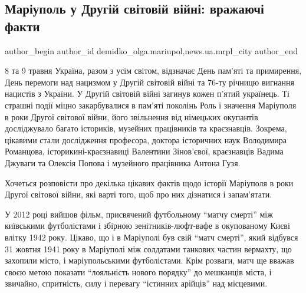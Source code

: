  
 
 
 
 
 
\subsection{Маріуполь у Другій світовій війні: вражаючі факти}
\label{sec:08_05_2021.stz.news.ua.mrpl_city.1.mrpl_druga_svitova_vijna_fakty}
 
\ifcmt
 author_begin
   author_id demidko_olga.mariupol,news.ua.mrpl_city
 author_end
\fi


8 та 9 травня Україна, разом з усім світом, відзначає День пам'яті та
примирення, День перемоги над нацизмом у Другій світовій війні та 76-ту річницю
вигнання нацистів з України. У Другій світовій війні загинув кожен п'ятий
українець. Ті страшні події міцно закарбувалися в пам'яті поколінь  Роль і
значення Маріуполя в роки Другої світової війни, його звільнення від німецьких
окупантів досліджувало багато істориків, музейних працівників та краєзнавців.
Зокрема, цікавими стали дослідження професора, доктора історичних наук
Володимира Романцова, історикині-краєзнавиці Валентини Зінов'євої, краєзнавців
Вадима Джуваги та Олексія Попова і музейного працівника Антона Гузя. 

Хочеться розповісти про декілька цікавих фактів щодо історії Маріуполя в роки
Другої світової війни, які варті того, щоб про них дізнатися і запам'ятати. 

У 2012 році вийшов фільм, присвячений футбольному \enquote{матчу смерті} між київськими
футболістами і збірною зенітників-люфт\hyp{}вафе в окупованому Києві влітку 1942
року. Цікаво, що і в Маріуполі був свій \enquote{матч смерті}, який відбувся 31 жовтня
1941 року в Маріуполі між солдатами танкових частин вермахту, що захопили
місто, і маріупольськими футболістами. Крім розваги, матч ще вважав своєю метою
показати \enquote{лояльність нового порядку} до мешканців міста, і звичайно,
спритність, силу і перевагу \enquote{істинних арійців} над місцевими.


